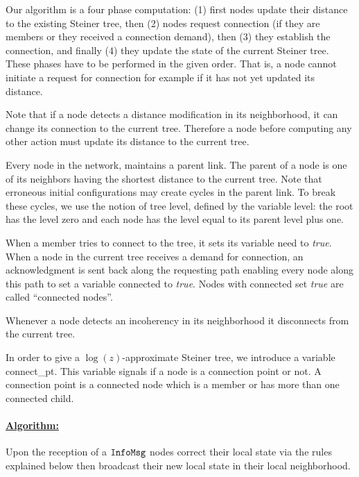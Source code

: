 \documentclass[11pt]{article}
\newcommand{\InfoMsg}{\mbox{\tt InfoMsg}}
\newcommand{\level}{\mbox{\sf level}}
\newcommand{\need}{\mbox{\sf need}}
\newcommand{\connect}{\mbox{\sf connected}}
\newcommand{\connectpt}{\mbox{\sf connect\_pt}}
\begin{document}
Our algorithm is a four phase computation: (1)
first nodes update their distance to the existing Steiner tree, then (2) nodes
request connection (if they are members or they received a connection
demand), then (3) they establish the
connection, and finally (4) they update the state of the current Steiner tree.  These
phases have to be performed in the given order.
That is, a node cannot initiate a request for connection for example if it has not yet updated
its distance.



Note that if a node detects a
distance modification in its neighborhood, it can change its
connection to the current tree. Therefore a node  before computing any
other action must update its
distance to the current tree. 

Every node in the network, 
maintains a
parent link. The parent of a node is one of its neighbors having the shortest
distance to the current tree. Note that erroneous initial configurations may create cycles in the
parent link. To break these cycles, we 
use the notion of tree level, defined by the variable \level: 
the root has the level zero and each node has the level equal to its parent level plus one.


When a member tries to connect to the
tree, it sets its variable
\need\/ to \emph{true}. 
When a node in the current tree receives a
demand for connection, an acknowledgment is sent back along the
requesting path enabling every node along this path to set a variable \connect\/ to
\emph{true}. Nodes with \connect\/ set \emph{true} are called
``connected nodes''. 

Whenever a node detects an incoherency in its neighborhood it disconnects
from the current tree. 



In order to give a $\log(z)$-approximate Steiner tree, we introduce a variable \connectpt. This variable
signals if a node is a connection point or not. A connection
point is a connected node which is a member or has more than one
connected child. 









\paragraph{\underline{Algorithm:}}
Upon the reception  of a $\InfoMsg$ nodes correct their local state
via the rules explained below then broadcast their new local state in 
their local neighborhood.
\end{document}
